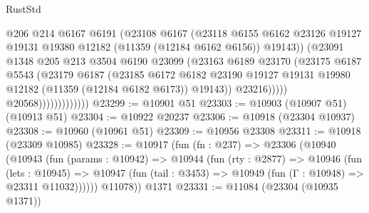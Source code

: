\begin{lexlean}{RustStd}
\begin{coremodule}
{{{{{{{{{{{{{{{{{{{                                  @206
                                  @214
                                  @6167
                                  @6191
                                  (@23108
                                    @6167
                                    (@23118
                                      @6155
                                      @6162
                                      @23126
                                      @19127
                                      @19131
                                      @19380
                                      @12182
                                      (@11359 (@12184 @6162 @6156))
                                      @19143))
                                  (@23091
                                    @1348
                                    @205
                                    @213
                                    @3504
                                    @6190
                                    @23099
                                    (@23163
                                      @6189
                                      @23170
                                      (@23175
                                        @6187
                                        @5543
                                        (@23179
                                          @6187
                                          (@23185
                                            @6172
                                            @6182
                                            @23190
                                            @19127
                                            @19131
                                            @19980
                                            @12182
                                            (@11359 (@12184 @6182 @6173))
                                            @19143))
                                        @23216)))))
                              @20568)))))))))))))
@23299 := @10901 @51
@23303 := @10903 (@10907 @51) (@10913 @51)
@23304 := @10922 @20237
@23306 := @10918 (@23304 @10937)
@23308 := @10960 (@10961 @51)
@23309 := @10956 @23308
@23311 := @10918 (@23309 @10985)
@23328 := @10917
    (fun (fn : @237) =>
    @23306
      (@10940
        (@10943
          (fun (params : @10942) =>
          @10944
            (fun (rty : @2877) =>
            @10946
              (fun (lets : @10945) =>
              @10947 (fun (tail : @3453) => @10949 (fun (Γ : @10948) => @23311 @11032))))))
        @11078))
    @1371
@23331 := @11084 (@23304 (@10935 @1371))
}}}}}}}}}}}}}}}}}}}
\end{coremodule}
\end{lexlean}
